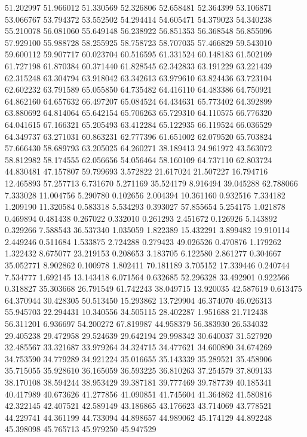 51.202997
51.966012
51.330569
52.326806
52.658481
52.364399
53.106871
53.066767
53.794372
53.552502
54.294414
54.605471
54.379023
54.340238
55.210078
56.081060
55.649148
56.238922
56.851353
56.368548
56.855096
57.929100
55.988728
58.255925
58.758723
58.707035
57.466829
59.543010
59.600112
59.907717
60.023704
60.516595
61.331524
60.148183
61.502109
61.727198
61.870384
60.371440
61.828545
62.342833
63.191229
63.221439
62.315248
63.304794
63.918042
63.342613
63.979610
63.824436
63.723104
62.602232
63.791589
65.055850
64.735482
64.416110
64.483386
64.750921
64.862160
64.657632
66.497207
65.084524
64.434631
65.773402
64.392899
63.880692
64.814064
65.642154
65.706263
65.729310
64.110575
66.776320
64.041615
67.166321
65.205493
63.412284
65.122935
66.119524
66.036529
64.349737
63.271031
60.863231
62.777396
61.651002
62.079520
65.703824
57.666430
58.689793
63.205025
64.260271
38.189413
24.961972
43.563072
58.812982
58.174555
62.056656
54.056464
58.160109
64.737110
62.803724
44.830481
47.157807
59.799693
3.572822
21.617024
21.507227
16.794716
12.465893
57.257713
6.731670
5.271169
35.524179
8.916494
39.045288
62.788066
7.333028
11.004756
5.290780
0.102656
2.004394
10.361160
0.932516
7.334182
1.209190
11.320584
0.583318
5.534293
0.393027
57.855654
5.254175
1.021878
0.469894
0.481438
0.267022
0.332010
0.261293
2.451672
0.126926
5.143892
0.329266
7.588543
36.537340
1.035059
1.822389
15.432291
3.899482
19.910114
2.449246
0.511684
1.533875
2.724288
0.279423
49.026526
0.470876
1.179262
1.322432
8.675077
23.219153
0.208653
3.183705
6.122580
2.861277
0.304667
35.052771
8.902862
0.100978
1.802411
70.181189
3.705152
17.339446
0.240744
7.534777
1.692145
13.143418
6.071564
0.632685
52.296328
33.492901
0.922566
0.318827
35.303668
26.791549
61.742243
38.049715
13.920035
42.587619
0.613475
64.370944
30.428305
50.513450
15.293862
13.729904
46.374070
46.026313
55.945703
22.294431
10.340556
34.505115
28.402287
1.951688
21.712438
56.311201
6.936697
54.200272
67.819987
44.958379
56.383930
26.534032
29.405238
29.472958
29.524639
29.642194
29.998342
30.640037
31.527920
32.485567
33.321687
33.979264
34.324715
34.477621
34.600890
34.674269
34.753590
34.779289
34.921224
35.016655
35.143339
35.289521
35.458906
35.715055
35.928610
36.165059
36.593225
36.810263
37.254579
37.809133
38.170108
38.594244
38.953429
39.387181
39.777469
39.787739
40.185341
40.417989
40.673626
41.277856
41.090851
41.745604
41.364862
41.580816
42.322145
42.407521
42.589149
43.186865
43.176623
43.714069
43.778521
44.229741
44.361199
44.733094
44.898657
44.989062
45.174129
44.892248
45.398098
45.765713
45.979250
45.947529
